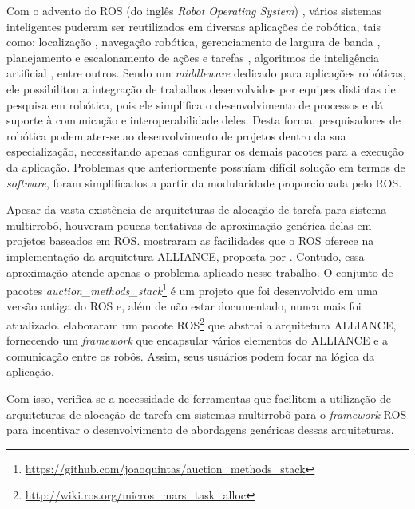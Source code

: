         Com o advento do ROS (do inglês \textit{Robot Operating System}) \cite{ref:quigley2009ros}, vários sistemas inteligentes puderam ser reutilizados em diversas aplicações de robótica, tais como: localização \cite{ref:li2017kld-samcl}, navegação robótica, gerenciamento de largura de banda \cite{ref:julio2015dynamic}, planejamento e escalonamento de ações e tarefas \cite{ref:fox2003pddl2, ref:manne1960job}, algoritmos de inteligência artificial \cite{ref:adrianohrl2015fuzzy, ref:watkins1992qlearning}, entre outros. Sendo um \textit{middleware} dedicado para aplicações robóticas, ele possibilitou a integração de trabalhos desenvolvidos por equipes distintas de pesquisa em robótica, pois ele simplifica o desenvolvimento de processos e dá suporte à comunicação e interoperabilidade deles. Desta forma, pesquisadores de robótica podem ater-se ao desenvolvimento de projetos dentro da sua especialização, necessitando apenas configurar os demais pacotes para a execução da aplicação. Problemas que anteriormente possuíam difícil solução em termos de \textit{software}, foram simplificados a partir da modularidade proporcionada pelo ROS.
        
        Apesar da vasta existência de arquiteturas de alocação de tarefa para sistema multirrobô, houveram poucas tentativas de aproximação genérica delas em projetos baseados em ROS.  mostraram as facilidades que o ROS oferece na implementação da arquitetura ALLIANCE, proposta por . Contudo, essa aproximação atende apenas o problema aplicado nesse trabalho. O conjunto de pacotes \textit{ auction\_methods\_stack}\footnote{\url{https://github.com/joaoquintas/auction_methods_stack}} é um projeto que foi desenvolvido em uma versão antiga do ROS e, além de não estar documentado, nunca mais foi atualizado.  elaboraram um pacote ROS\footnote{\url{http://wiki.ros.org/micros_mars_task_alloc}} que abstrai a arquitetura ALLIANCE, fornecendo um \textit{framework} que encapsular vários elementos do ALLIANCE e a comunicação entre os robôs. Assim, seus usuários podem focar na lógica da aplicação. %
        
        Com isso, verifica-se a necessidade de ferramentas que facilitem a utilização de arquiteturas de alocação de tarefa em sistemas multirrobô para o \textit{framework} ROS para incentivar o desenvolvimento de abordagens genéricas dessas arquiteturas.
    

